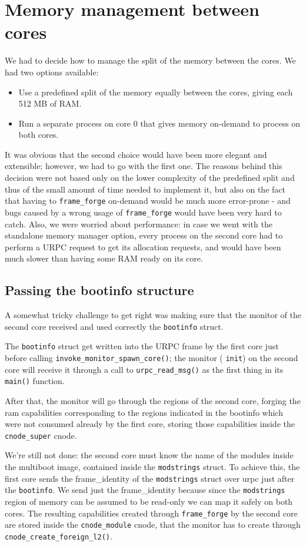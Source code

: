 \documentclass[a4paper,twoside,openright]{report}
\renewcommand{\t}[1]{%
	{\texttt{#1}}}
\begin{document}
\section{Memory management between cores}

We had to decide how to manage the split of the memory between the cores. We had two options available:
\begin{itemize}
	\item Use a predefined split of the memory equally between the cores, giving each 512 MB of RAM.
	\item Run a separate process on core 0 that gives memory on-demand to process on both
	cores.
\end{itemize}
It was obvious that the second choice would have been more elegant and extensible; however, we had to go with the first one. 
The reasons behind this decision were not based only on the lower complexity of the predefined
split and thus of the small amount of time needed to implement it, but also on the fact that 
having to \t{frame\_forge} on-demand would be much more error-prone - and bugs caused by a 
wrong usage of \t{frame\_forge} would have been very hard to catch. Also, we were worried about
performance: in case we went with the standalone memory manager option, every process on the
second core had to perform a URPC request to get its allocation requests, and would have been
much slower than having some RAM ready on its core.

\subsection{Passing the bootinfo structure}

A somewhat tricky challenge to get right was making sure that the monitor of the second core
received and used correctly the \t{bootinfo} struct. 

The \t{bootinfo} struct get written into the URPC frame by the first core just before calling \t{invoke\_monitor\_spawn\_core()}; the monitor (\t{init}) on the second core will receive 
it through a call to \t{urpc\_read\_msg()} as the first thing in its \t{main()} function.

After that, the monitor will go through the regions of the second core, forging the ram
capabilities corresponding to the regions indicated in the bootinfo which were not consumed
already by the first core, storing those capabilities inside the \t{cnode\_super} cnode.

We're still not done: the second core must know the name of the modules inside the
multiboot image, contained inside the \t{modstrings} struct. To achieve this, the first
core sends the frame\_identity of the \t{modstrings} struct over urpc just after the 
\t{bootinfo}. We send just the frame\_identity because since the \t{modstrings} region
of memory can be assumed to be read-only we can map it safely on both cores. The resulting
capabilities created through \t{frame\_forge} by the second core are stored inside the
\t{cnode\_module} cnode, that the monitor has to create through \t{cnode\_create\_foreign\_l2()}.
\end{document}
